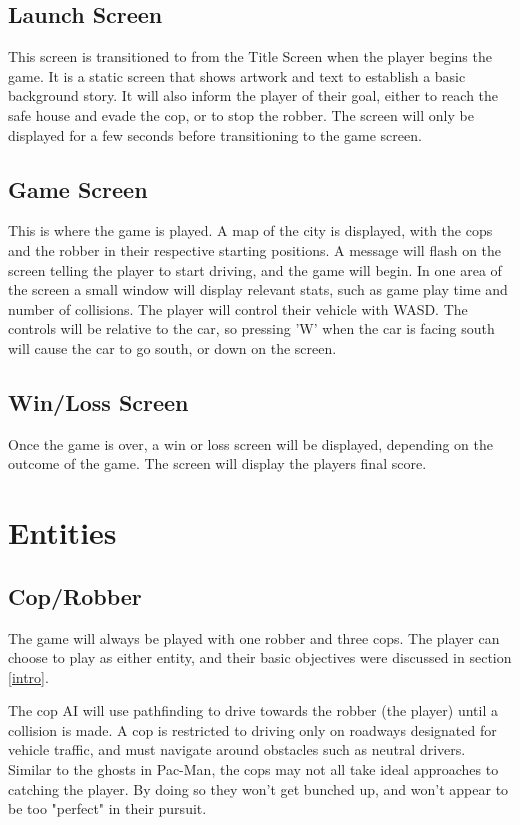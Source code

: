 \documentclass[12pt]{article}
\begin{document}
\subsection{Launch Screen}
This screen is transitioned to from the Title Screen when the player begins the game. It is a static screen that shows artwork and text to establish a basic background story. It will also inform the player of their goal, either to reach the safe house and evade the cop, or to stop the robber. The screen will only be displayed for a few seconds before transitioning to the game screen.

\subsection{Game Screen}
This is where the game is played. A map of the city is displayed, with the cops and the robber in their respective starting positions. A message will flash on the screen telling the player to start driving, and the game will begin. In one area of the screen a small window will display relevant stats, such as game play time and number of collisions. The player will control their vehicle with WASD. The controls will be relative to the car, so pressing 'W' when the car is facing south will cause the car to go south, or down on the screen.

\subsection{Win/Loss Screen}
Once the game is over, a win or loss screen will be displayed, depending on the outcome of the game. The screen will display the players final score.

\section{Entities}

\subsection{Cop/Robber}
The game will always be played with one robber and three cops. The player can choose to play as either entity, and their basic objectives were discussed in section \ref{intro}. 

\par The cop AI will use pathfinding to drive towards the robber (the player) until a collision is made. A cop is restricted to driving only on roadways designated for vehicle traffic, and must navigate around obstacles such as neutral drivers. Similar to the ghosts in Pac-Man, the cops may not all take ideal approaches to catching the player. By doing so they won't get bunched up, and won't appear to be too "perfect" in their pursuit.
\end{document}
